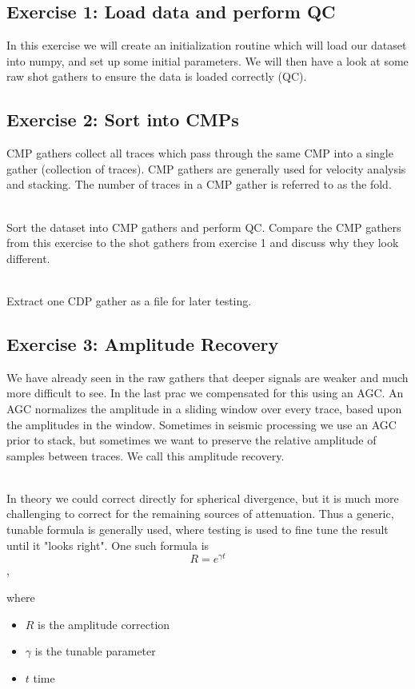 \subsection*{Exercise 1: Load data and perform QC}
In this exercise we will create an initialization routine which will load our dataset into numpy, and set up some initial parameters. We will then have a look at some raw shot gathers to ensure the data is loaded correctly (QC).
\subsection*{Exercise 2: Sort into CMPs}
CMP gathers collect all traces which pass through the same CMP into a single gather (collection of traces).  CMP gathers are generally used for velocity analysis and stacking. The number of traces in a CMP gather is referred to as the fold.  
\par~\\
Sort the dataset into CMP gathers and perform QC.  Compare the CMP gathers from this exercise to the shot gathers from exercise 1 and discuss why they look different.
\par~\\
Extract one CDP gather as a file for later testing.  

\subsection*{Exercise 3: Amplitude Recovery}
We have already seen in the raw gathers that deeper signals are weaker and much more difficult to see. In the last prac we compensated for this using an AGC.  An AGC normalizes the amplitude in a sliding window over every trace, based upon the amplitudes in the window.  Sometimes in seismic processing we use an AGC prior to stack, but sometimes we want to preserve the relative amplitude of samples between traces.  We call this amplitude recovery.
\par~\\
In theory we could correct directly for spherical divergence, but it is much more challenging to correct for the remaining sources of attenuation.  Thus a generic, tunable formula is generally used, where testing is used to fine tune the result until it "looks right".  One such formula is
\[ R = e^{\gamma t}\],

where
\begin{itemize}
\item $R$ is the amplitude correction
\item $\gamma$ is the tunable parameter
\item $t$ time
\end{itemize}

